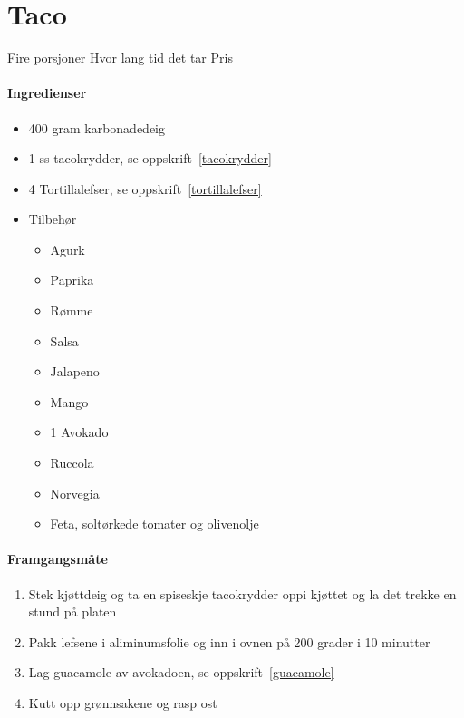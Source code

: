 \section{﻿Taco}
\label{taco}

Fire porsjoner
Hvor lang tid det tar
Pris

\paragraph{Ingredienser}
\begin{itemize}[noitemsep]
	\item 400 gram karbonadedeig
	\item 1 ss tacokrydder, se oppskrift~\ref{tacokrydder}
	\item 4 Tortillalefser, se oppskrift~\ref{tortillalefser}
	\item Tilbehør
		\begin{itemize}[noitemsep]
			\item Agurk
			\item Paprika
			\item Rømme
			\item Salsa
			\item Jalapeno
			\item Mango
			\item 1 Avokado
			\item Ruccola
			\item Norvegia
			\item Feta, soltørkede tomater og olivenolje
			\end{itemize}
\end{itemize}

\paragraph{Framgangsmåte}
\begin{enumerate}[noitemsep]
	\item Stek kjøttdeig og ta en spiseskje tacokrydder oppi kjøttet og la det trekke en stund på platen
	\item Pakk lefsene i aliminumsfolie og inn i ovnen på 200 grader i 10 minutter
	\item Lag guacamole av avokadoen, se oppskrift~\ref{guacamole}
	\item Kutt opp grønnsakene og rasp ost
\end{enumerate}
